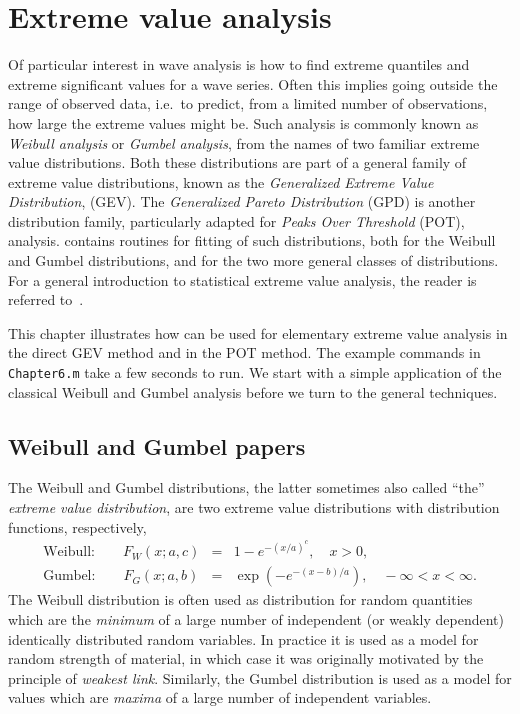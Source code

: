 %
\chapter{Extreme value analysis}\label{cha:6}
Of particular interest in wave analysis is how to find extreme
quantiles and extreme significant values for a wave series.
Often this implies going outside the range of observed data, i.e.\ to
predict, from a limited number of observations, how large the extreme
values might be. Such analysis is commonly known as {\em Weibull
analysis} or {\em Gumbel analysis}, from the names of two familiar
extreme value distributions.
Both these distributions are part of a general family of extreme
value distributions, known as the {\em Generalized Extreme Value
Distribution}, (GEV). The {\em Generalized Pareto Distribution} (GPD)
is another distribution family, particularly adapted for
{\em Peaks Over Threshold} (POT), analysis.
\progname{} contains routines
for fitting of such distributions, both for the Weibull and Gumbel
distributions, and for the two more general classes of distributions.
For a general introduction to statistical extreme value analysis,
the reader is referred to~\cite{Coles2001}.

This chapter illustrates how \progname{} can be used for elementary
extreme value analysis in the direct GEV method and in the POT method. The
example commands in \verb+Chapter6.m+
take a few seconds to run. 
We start with a simple application of the classical
Weibull and Gumbel analysis before we turn to the general techniques.

\section{Weibull and Gumbel papers}
The Weibull and  Gumbel distributions,
 the latter sometimes
also called ``the''
{\em extreme value distribution}, are two
extreme value distributions with distribution functions, respectively,
\begin{eqnarray}
\mbox{Weibull:} \qquad F_W(x; a, c) & = & 1 - e^{-{(x/a)^c}}, \quad x > 0,
\label{eq:Wei}
\\[0.5em]
\mbox{Gumbel:} \qquad F_G(x; a, b) & = & \exp\left( - e^{-(x-b)/a}\right),
\quad -\infty < x < \infty. \label{eq:Gum}
\end{eqnarray}
The Weibull distribution is often used as distribution for random
quantities which are the \emph{minimum} of a large number of independent
(or weakly dependent) identically distributed random variables.
In practice it is used as a model for random strength of material, in
which case it was originally motivated by the principle of {\em
weakest link}. 
Similarly, the Gumbel distribution is used as a model
for values which are \emph{maxima} of a large number of independent variables.

